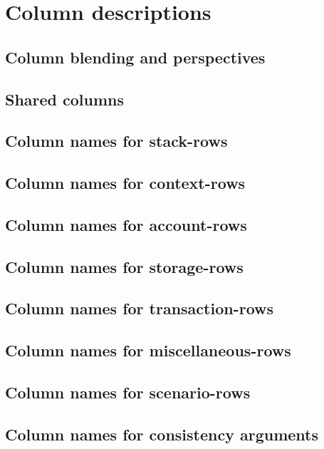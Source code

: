 

\section{Column descriptions                          \lispDone{}}    \label{hub: columns}
\subsection{Column blending and perspectives}                         \label{hub: perspectives}                    
\subsection{Shared columns                            \lispDone{}}    \label{hub: shared columns}                  
\subsection{Column names for stack-rows               \lispDone{}}    \label{hub: stack columns}                   
\subsection{Column names for context-rows             \lispDone{}}    \label{hub: context columns}                 
\subsection{Column names for account-rows             \lispDone{}}    \label{hub: account columns}                 
\subsection{Column names for storage-rows             \lispDone{}}    \label{hub: storage columns}                 
\subsection{Column names for transaction-rows         \lispDone{}}    \label{hub: transaction columns}             
\subsection{Column names for miscellaneous-rows       \lispDone{}}    \label{hub: miscellaneous columns}           
\subsection{Column names for scenario-rows            \lispDone{}}    \label{hub: scenario columns}                
\subsection{Column names for consistency arguments    \lispDone{}}    \label{hub: consistency argument columns}    
